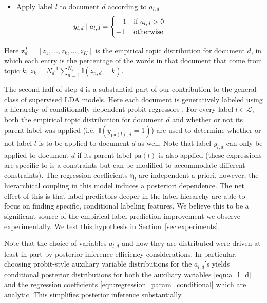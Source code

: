 \begin{enumerate}
\begin{itemize}
\begin{itemize}
\item Apply label $l$ to document $d$ according to $a_{l,d}$ \[\hspace{-2cm}
y_{l,d}\mid a_{l,d}=\begin{cases}
\ \ \ 1 & \text{if \ensuremath{a_{l,d}>0}} \\%
-1 & \text{otherwise}\end{cases}\]
 
\end{itemize}
\end{itemize}
\end{enumerate}


Here $\bar{\mathbf{z}}_d^T = [\bar{z}_{1}, \ldots, \bar{z}_k, \ldots, \bar{z}_K]$ is the empirical topic distribution for document $d$, in which each entry is the percentage of the words in that document that come from topic $k$, $\bar{z}_{k}=N_{d}^{-1}\sum_{n=1}^{N_d}\mathbb{I}(z_{n,d}=k).$ 

The second half of step 4 is a substantial part of our contribution to the general class of supervised LDA models.  Here each document is generatively labeled using a hierarchy of conditionally dependent probit regressors \cite{gelman?,probit_regression?}.  For every label $l \in \mathcal{L}$, both the empirical topic distribution for document $d$ and whether or not its parent label was applied (i.e.~$\mathbb{I}(y_{\mathrm{pa}(l),d}=1)$) are used to determine whether or not  label $l$ is to be applied to  document $d$ as well.  Note that label $y_{l,d}$ can only be applied to document $d$ if its parent label $\mathrm{pa}(l)$ is also applied (these expressions are specific to is-a constraints but can be modified to accommodate different constraints).  The regression coefficients $\boldsymbol\eta_l$ are independent a priori, however, the hierarchical coupling in this model induces a posteriori dependence.   The net effect of this is that label predictors deeper in the label hierarchy are able to focus on finding specific, conditional labeling features.  We believe this to be a significant source of the empirical label prediction improvement we observe experimentally.  We test this hypothesis in Section~\ref{sec:experiments}.

Note that the choice of variables $a_{l,d}$ and how they are distributed were  driven at least in part by posterior inference efficiency considerations.  In particular, choosing probit-style auxiliary variable distributions for the $a_{l,d}$'s  yields conditional posterior distributions for both the auxiliary variables \eqref{eqn:a_l_d} and the regression coefficients \eqref{eqn:regression_param_conditional} which are analytic.  This simplifies posterior inference substantially.

